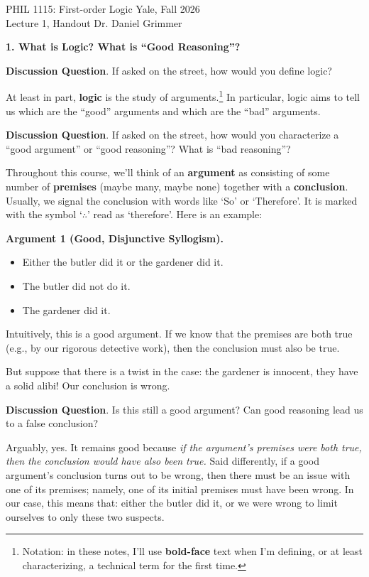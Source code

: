 \documentclass[options]{philosophersimprint}
\theoremstyle{definition}
\begin{document}
PHIL 1115: First-order Logic \hfill Yale, Fall 2026\\
Lecture 1, Handout \hfill Dr. Daniel Grimmer

\textbf{1. What is Logic? What is ``Good Reasoning''?}

\textbf{Discussion Question}. If asked on the street, how would you define logic?

At least in part, \textbf{logic} is the study of arguments.\footnote{Notation: in these notes, I'll use \textbf{bold-face} text when I'm defining, or at least characterizing, a technical term for the first time.} In particular, logic aims to tell us which are the ``good'' arguments and which are the ``bad'' arguments.

\textbf{Discussion Question}. If asked on the street, how would you characterize a ``good argument'' or ``good reasoning''? What is ``bad reasoning''?

Throughout this course, we'll think of an \textbf{argument} as consisting of some number of \textbf{premises} (maybe many, maybe none) together with a \textbf{conclusion}. Usually, we signal the conclusion with words like `So' or `Therefore'. It is marked with the symbol `$\therefore$' read as `therefore'. Here is an example:

\textbf{Argument 1 (Good, Disjunctive Syllogism).}
\begin{itemize}
    \item[] Either the butler did it or the gardener did it.
    \item[] The butler did not do it.
    \item[$\therefore$] The gardener did it.
\end{itemize}
Intuitively, this is a good argument. If we know that the premises are both true (e.g., by our rigorous detective work), then the conclusion must also be true.

But suppose that there is a twist in the case: the gardener is innocent, they have a solid alibi! Our conclusion is wrong.

\textbf{Discussion Question}. Is this still a good argument? Can good reasoning lead us to a false conclusion?

Arguably, yes. It remains good because \textit{if the argument's premises were both true, then the conclusion would have also been true.} Said differently, if a good argument's conclusion turns out to be wrong, then there must be an issue with one of its premises; namely, one of its initial premises must have been wrong. In our case, this means that: either the butler did it, or we were wrong to limit ourselves to only these two suspects.
\end{document}
